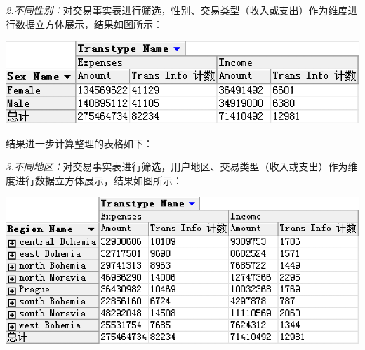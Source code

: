 \documentclass[a4paper]{article}
\begin{document}
\begin{enumerate}
  \textit{2.不同性别：}对交易事实表进行筛选，性别、交易类型（收入或支出）作为维度进行数据立方体展示，结果如图所示：
  \begin{center}
    \includegraphics[scale=0.6]{Pictures/SEXTR}
  \end{center}
  结果进一步计算整理的表格如下：
  \begin{center}
  \end{center}

  \textit{3.不同地区：}对交易事实表进行筛选，用户地区、交易类型（收入或支出）作为维度进行数据立方体展示，结果如图所示：
  \begin{center}
    \includegraphics[scale=0.6]{Pictures/DISTR}
  \end{center}
  

\end{enumerate}
\end{document}
